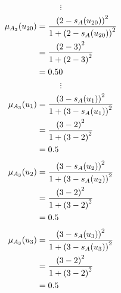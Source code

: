 \documentclass[a4paper]{book}
\begin{document}
				\[
					\vdots
				\]
				\begin{align}
					\mu_{A_2}(u_{20}) &= \frac{\left(2-s_A(u_{20})\right)^2}{1 + \left(2-s_A(u_{20})\right)^2}\\
					&= \frac{\left(2-3\right)^2}{1 + \left(2-3\right)^2} \notag \\
					&= 0.50 \notag
				\end{align}
				\[
					\vdots
				\]
				\begin{align}
					\mu_{A_3}(u_1) &= \frac{\left(3-s_A(u_1)\right)^2}{1 + \left(3-s_A(u_1)\right)^2}\\
					&= \frac{\left(3-2\right)^2}{1 + \left(3-2\right)^2} \notag \\
					&= 0.5 \notag
				\end{align}
				\begin{align}
					\mu_{A_3}(u_2) &= \frac{\left(3-s_A(u_2)\right)^2}{1 + \left(3-s_A(u_2)\right)^2}\\
					&= \frac{\left(3-2\right)^2}{1 + \left(3-2\right)^2} \notag \\
					&= 0.5 \notag
				\end{align}
				\begin{align}
					\mu_{A_3}(u_3) &= \frac{\left(3-s_A(u_3)\right)^2}{1 + \left(3-s_A(u_3)\right)^2}\\
					&= \frac{\left(3-2\right)^2}{1 + \left(3-2\right)^2} \notag \\
					&= 0.5 \notag
				\end{align}
\end{document}
